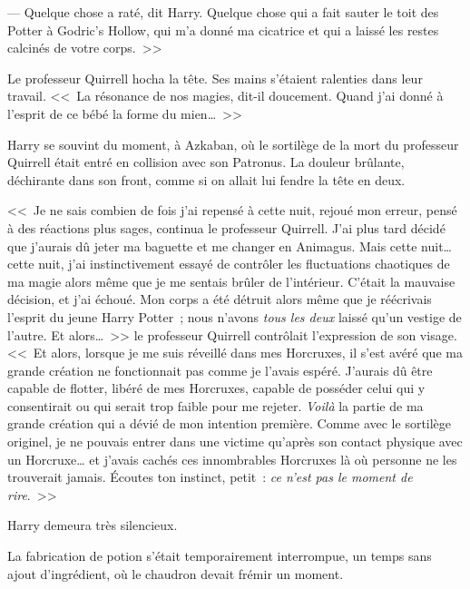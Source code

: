 --- Quelque chose a raté, dit Harry. Quelque chose qui a fait sauter le toit des Potter à Godric's Hollow, qui m'a donné ma cicatrice et qui a laissé les restes calcinés de votre corps.~>>

Le professeur Quirrell hocha la tête. Ses mains s'étaient ralenties dans leur travail. <<~La résonance de nos magies, dit-il doucement. Quand j'ai donné à l'esprit de ce bébé la forme du mien…~>>

Harry se souvint du moment, à Azkaban, où le sortilège de la mort du professeur Quirrell était entré en collision avec son Patronus. La douleur brûlante, déchirante dans son front, comme si on allait lui fendre la tête en deux.

<<~Je ne sais combien de fois j'ai repensé à cette nuit, rejoué mon erreur, pensé à des réactions plus sages, continua le professeur Quirrell. J'ai plus tard décidé que j'aurais dû jeter ma baguette et me changer en Animagus. Mais cette nuit… cette nuit, j'ai instinctivement essayé de contrôler les fluctuations chaotiques de ma magie alors même que je me sentais brûler de l'intérieur. C'était la mauvaise décision, et j'ai échoué. Mon corps a été détruit alors même que je réécrivais l'esprit du jeune Harry Potter~; nous n'avons \emph{tous les deux} laissé qu'un vestige de l'autre. Et alors…~>> le professeur Quirrell contrôlait l'expression de son visage. <<~Et alors, lorsque je me suis réveillé dans mes Horcruxes, il s'est avéré que ma grande création ne fonctionnait pas comme je l'avais espéré. J'aurais dû être capable de flotter, libéré de mes Horcruxes, capable de posséder celui qui y consentirait ou qui serait trop faible pour me rejeter. \emph{Voilà} la partie de ma grande création qui a dévié de mon intention première. Comme avec le sortilège originel, je ne pouvais entrer dans une victime qu'après son contact physique avec un Horcruxe… et j'avais cachés ces innombrables Horcruxes là où personne ne les trouverait jamais. Écoutes ton instinct, petit~: \emph{ce n'est pas le moment de rire}.~>>

Harry demeura très silencieux.

La fabrication de potion s'était temporairement interrompue, un temps sans ajout d'ingrédient, où le chaudron devait frémir un moment.

